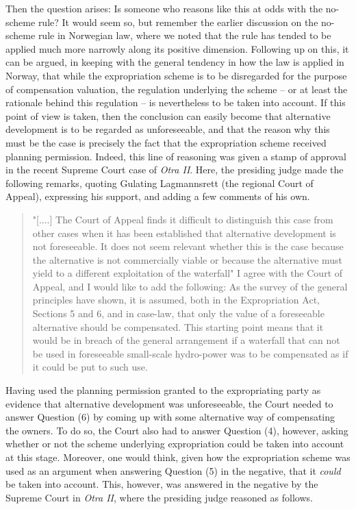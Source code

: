 Then the question arises: Is someone who reasons like this at odds with the no-scheme rule? It would seem so, but remember the earlier discussion on the no-scheme rule in Norwegian law, where we noted that the rule has tended to be applied much more narrowly along its positive dimension. Following up on this, it can be argued, in keeping with the general tendency in how the law is applied in Norway, that while the expropriation scheme is to be disregarded for the purpose of compensation valuation, the regulation underlying the scheme -- or at least the rationale behind this regulation -- is nevertheless to be taken into account. If this point of view is taken, then the conclusion can easily become that alternative development is to be regarded as unforeseeable, and that the reason why this must be the case is precisely the fact that the expropriation scheme received planning permission. Indeed, this line of reasoning was given a stamp of approval in the recent Supreme Court case of \emph{Otra II}. Here, the presiding judge made the following remarks, quoting Gulating Lagmannsrett (the regional Court of Appeal), expressing his support, and adding a few comments of his own.

\begin{quote}
"[....] The Court of Appeal finds it difficult to distinguish this case from other cases when it has been established that alternative development is not foreseeable. It does not seem relevant whether this is the case because the alternative is not commercially viable or because the alternative must yield to a different exploitation of the waterfall" 
I agree with the Court of Appeal, and I would like to add the following: As the survey of the general principles have shown, it is assumed, both in the Expropriation Act, Sections 5 and 6, and in case-law, that only the value of a foreseeable alternative should be compensated. This starting point means that it would be in breach of the general arrangement if a waterfall that can not be used in foreseeable small-scale hydro-power was to be compensated as if it could be put to such use.
\end{quote}

Having used the planning permission granted to the expropriating party as evidence that alternative development was unforeseeable, the Court needed to answer Question (6) by coming up with some alternative way of compensating the owners.  To do so, the Court also had to answer Question (4), however, asking whether or not the scheme underlying expropriation could be taken into account at this stage. Moreover, one would think, given how the expropriation scheme was used as an argument when answering Question (5) in the negative, that it \emph{could} be taken into account. This, however, was answered in the negative by the Supreme Court in \emph{Otra II}, where the presiding judge reasoned as follows.

